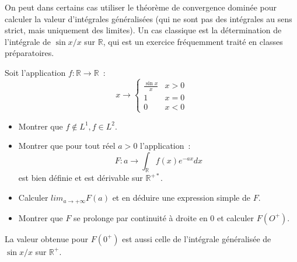 On peut dans certains cas utiliser le théorème de convergence dominée pour
calculer la valeur d'intégrales généralisées (qui ne sont pas des intégrales au
sens strict, mais uniquement des limites). Un cas classique est la détermination
de l'intégrale de $\sin x / x$ sur $\mathbb{R}$, qui est un exercice
fréquemment traité en classes préparatoires.
\begin{exercice}
Soit l'application $f : \mathbb{R} \to \mathbb{R}$~:
\[
x \to \left \{
\begin{array}{cc}
\frac{\sin x}{x} & x > 0 \\
1 & x = 0 \\
0 & x < 0
\end{array}
\right .
\]
\begin{itemize}
\item Montrer que $f \notin L^1, f \in L^2$.
\item Montrer que pour tout réel $a > 0$ l'application~:
\[
F : a \to \int_{\mathbb{R}} f(x) e^{-ax} dx
\]
est bien définie et est dérivable sur $\mathbb{R}^{+*}$.
\item Calculer $lim_{a \to +\infty} F(a)$ et en déduire une expression simple de $F$.
\item Montrer que $F$ se prolonge par continuité à droite en 0 et calculer $F(O^+)$.
\end{itemize}
La valeur obtenue pour $F(0^+)$ est aussi celle de l'intégrale généralisée de
$\sin x/ x$ sur $\mathbb{R}^+$.
\end{exercice}

